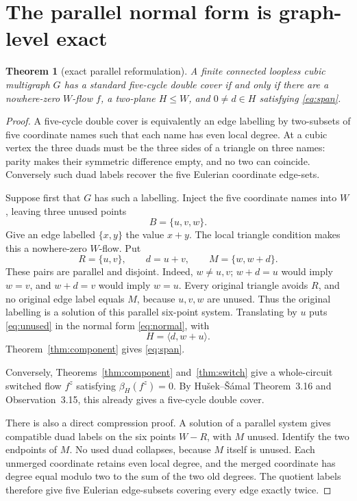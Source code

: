 \documentclass[11pt]{article}
\newtheorem{theorem}{Theorem}[section]
\theoremstyle{definition}
\theoremstyle{remark}
\numberwithin{equation}{section}
\begin{document}
\section{The parallel normal form is graph-level exact}

\begin{theorem}[exact parallel reformulation]\label{thm:exact}
A finite connected loopless cubic multigraph \(G\) has a standard
five-cycle double cover if and only if there are a nowhere-zero
\(W\)-flow \(f\), a two-plane \(H\le W\), and
\(0\ne d\in H\) satisfying \eqref{eq:span}.
\end{theorem}

\begin{proof}
A five-cycle double cover is equivalently an edge labelling by
two-subsets of five coordinate names such that each name has even local
degree.  At a cubic vertex the three duads must be the three sides of a
triangle on three names: parity makes their symmetric difference empty,
and no two can coincide.  Conversely such duad labels recover the five
Eulerian coordinate edge-sets.

Suppose first that \(G\) has such a labelling.  Inject the five coordinate
names into \(W\), leaving three unused points
\[
                              B=\{u,v,w\}.
\]
Give an edge labelled \(\{x,y\}\) the value \(x+y\).  The local triangle
condition makes this a nowhere-zero \(W\)-flow.  Put
\begin{equation}
             R=\{u,v\},\qquad d=u+v,\qquad
             M=\{w,w+d\}.                                  \label{eq:unused}
\end{equation}
These pairs are parallel and disjoint.  Indeed, \(w\ne u,v\);
\(w+d=u\) would imply \(w=v\), and \(w+d=v\) would imply \(w=u\).
Every original triangle avoids \(R\), and no original edge label equals
\(M\), because \(u,v,w\) are unused.  Thus the original labelling is a
solution of this parallel six-point system.  Translating by \(u\) puts
\eqref{eq:unused} in the normal form \eqref{eq:normal}, with
\[
                             H=\langle d,w+u\rangle.
\]
Theorem~\ref{thm:component} gives \eqref{eq:span}.

Conversely, Theorems~\ref{thm:component} and~\ref{thm:switch} give a
whole-circuit switched flow \(f^z\) satisfying \(\beta_H(f^z)=0\).
By Hu\v{s}ek--\v{S}\'amal Theorem~3.16 and Observation~3.15, this
already gives a five-cycle double cover.

There is also a direct compression proof.  A solution of a parallel
system gives compatible duad labels on the six points \(W-R\), with
\(M\) unused.  Identify the two endpoints of \(M\).  No used duad
collapses, because \(M\) itself is unused.  Each unmerged coordinate
retains even local degree, and the merged coordinate has degree equal
modulo two to the sum of the two old degrees.  The quotient labels
therefore give five Eulerian edge-subsets covering every edge exactly
twice.
\end{proof}
\end{document}
